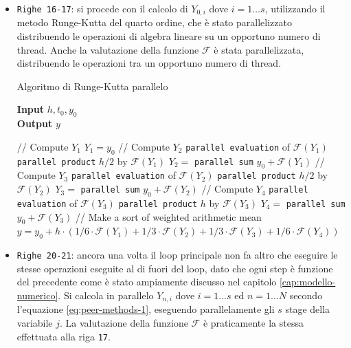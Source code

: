 \begin{itemize}
    \item \texttt{Righe 16-17}: si procede con il calcolo di $Y_{0, i}$ dove $i = 1 \ldots s$, utilizzando il metodo Runge-Kutta del quarto ordine, che è stato parallelizzato distribuendo le operazioni di algebra lineare su un opportuno numero di thread. Anche la valutazione della funzione $\mathcal{F}$ è stata parallelizzata, distribuendo le operazioni tra un opportuno numero di thread.
    \newpage
    \begin{breakablealgorithm}
        \caption{Algoritmo di Runge-Kutta parallelo}\label{alg:RK4Alg}
        \vspace{0.5cm}
        \textbf{Input} $h, t_0, y_0$ \\
        \textbf{Output} $y$
        \vspace{0.5cm}
        \begin{algorithmic}[1]
            \Statex // Compute $Y_1$
            \State $Y_1 = y_0$
            \Statex // Compute $Y_2$
            \State \texttt{parallel evaluation} of $\mathcal{F}(Y_1)$
            \State \texttt{parallel product} $h / 2$ by $\mathcal{F}(Y_1)$
            \State $Y_2 =$ \texttt{parallel sum} $y_0 + \mathcal{F}(Y_1)$
            \Statex // Compute $Y_3$
            \State \texttt{parallel evaluation} of $\mathcal{F}(Y_2)$
            \State \texttt{parallel product} $h / 2$ by $\mathcal{F}(Y_2)$
            \State $Y_3 =$ \texttt{parallel sum} $y_0 + \mathcal{F}(Y_2)$
            \Statex // Compute $Y_4$
            \State \texttt{parallel evaluation} of $\mathcal{F}(Y_3)$
            \State \texttt{parallel product} $h$ by $\mathcal{F}(Y_3)$
            \State $Y_4 =$ \texttt{parallel sum} $y_0 + \mathcal{F}(Y_3)$
            \Statex // Make a sort of weighted arithmetic mean
            \State $y = y_0 + h \cdot (1/6 \cdot \mathcal{F}(Y_1) + 1/3 \cdot \mathcal{F}(Y_2) + 1/3 \cdot \mathcal{F}(Y_3) + 1/6 \cdot \mathcal{F}(Y_4))$
        \end{algorithmic}
    \end{breakablealgorithm}
    
    \item \texttt{Righe 20-21}: ancora una volta il loop principale non fa altro che eseguire le stesse operazioni eseguite al di fuori del loop, dato che ogni step è funzione del precedente come è stato ampiamente discusso nel capitolo \ref{cap:modello-numerico}. Si calcola in parallelo $Y_{n, i}$ dove $i = 1 \ldots s$ ed $n = 1 \ldots N$ secondo l'equazione \eqref{eq:peer-methods-1}, eseguendo parallelamente gli $s$ stage della variabile $j$. La valutazione della funzione $\mathcal{F}$ è praticamente la stessa effettuata alla riga \texttt{17}.
\end{itemize}

